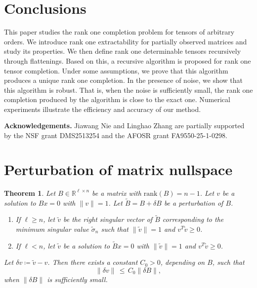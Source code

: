 \documentclass{amsart}
\newcommand{\re}{\mathbb{R}}
\newcommand{\dt}{\delta}
\newcommand{\tv}{\tilde{v}}
\newcommand{\tsig}{\tilde{\sigma}}
\def\rank{\mbox{rank}}
\newcommand{\bnum}{\begin{enumerate}}
\newcommand{\enum}{\end{enumerate}}
\newcommand{\be}{\begin{equation}}
\newcommand{\ee}{\end{equation}}
\newtheorem{theorem}{Theorem}[section]
\theoremstyle{definition}
\numberwithin{equation}{section}
\begin{document}
\section{Conclusions}

This paper studies the rank one completion problem for tensors of arbitrary orders.
We introduce rank one extractability for partially observed matrices 
and study its properties.
We then define rank one determinable tensors recursively through flattenings.
Based on this, a recursive algorithm is proposed for rank one tensor completion. 
Under some assumptions, 
we prove that this algorithm produces a unique rank one completion.
In the presence of noise, we show that this algorithm is robust.
That is, when the noise is sufficiently small, 
the rank one completion produced by the algorithm is close to the exact one.
Numerical experiments illustrate the efficiency and accuracy of our method.




\smallskip
\noindent \textbf{Acknowledgements.}
Jiawang Nie and Linghao Zhang are partially supported by 
the NSF grant DMS2513254 
and the AFOSR grant FA9550-25-1-0298.



















\appendix

\section{Perturbation of matrix nullspace}

\begin{theorem}\label{thm:mx_null_perturb}
Let $B \in \re^{\ell \times n}$ be a matrix with $\rank (B) = n-1$.
Let $v$ be a solution to $Bx = 0$ with $\|v\|=1$.
Let $\widetilde{B} = B + \dt B$ be a perturbation of $B$.

\bnum
\item[(i)] If $\ell \ge n$, let $\tv$ be the right singular vector of $\widetilde{B}$ corresponding to the minimum singular value $\tsig_n$ such that $\|\tv\|=1$ and $v^T\tv \ge 0$.

\item[(ii)] If $\ell<n$, let $\tv$ be a solution to $\widetilde{B}x = 0$ with $\|\tv\|=1$ and $v^T\tv \ge 0$.
\enum
Let $\dt v \coloneqq \tv - v$.
Then there exists a constant $C_0>0$, depending on $B$, such that
\be\label{dv<=C0dB}
\|\dt v\| \,\le\, C_0 \|\dt B\|,
\ee
when $\|\dt B\|$ is sufficiently small.
\end{theorem}
\end{document}
